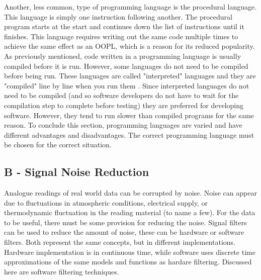 \documentclass[twoside,a4]{report}
\def\br{\newline \newline \noindent}
\begin{document}
Another, less common, type of programming language is the procedural language. This language is simply one instruction following another\cite{proglangwhatisoopl}. The procedural program starts at the start and continues down the list of instructions until it finishes. This language requires writing out the same code multiple times to achieve the same effect as an OOPL, which is a reason for its reduced popularity. \br
As previously mentioned, code written in a programming language is usually compiled before it is run. However, some languages do not need to be compiled before being run. These languages are called "interpreted" languages and they are "compiled" line by line when you run them \cite{proglanginterp}. Since interpreted languages do not need to be compiled (and so software developers do not have to wait for the compilation step to complete before testing) they are preferred for developing software. However, they tend to run slower than compiled programs for the same reason. \br
To conclude this section,  programming languages are varied and have different advantages and disadvantages. The correct programming language must be chosen for the correct situation.

\subsection*{B -  Signal Noise Reduction}
Analogue readings of real world data can be corrupted by noise. Noise can appear due to fluctuations in atmospheric conditions, electrical supply, or thermodynamic fluctuation in the reading material (to name a few). For the data to be useful, there must be some provision for reducing the noise. Signal filters can be used to reduce the amount of noise, these can be hardware or software filters. Both represent the same concepts, but in different implementations. Hardware implementation is in continuous time, while software uses discrete time approximations of the same models and functions as hardare filtering. Discussed here are software filtering techniques. \br

\end{document}
